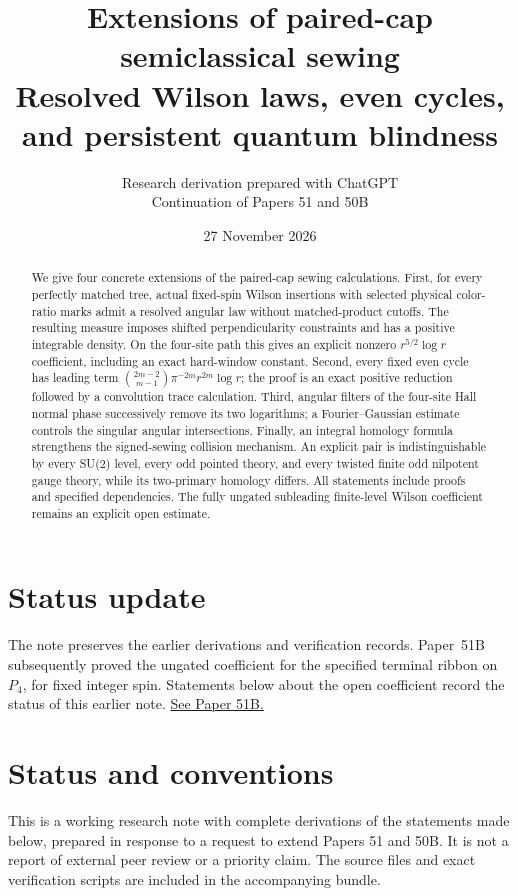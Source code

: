 \documentclass[11pt]{article}
\title{Extensions of paired-cap semiclassical sewing\\[4pt]
\large Resolved Wilson laws, even cycles, and persistent quantum blindness}
\author{Research derivation prepared with ChatGPT\\
\small Continuation of Papers 51 and 50B}
\date{27 November 2026}
\theoremstyle{remark}\newtheorem{remark}[theorem]{Remark}
\begin{document}
\maketitle
\begin{abstract}
We give four concrete extensions of the paired-cap sewing calculations.
First, for every perfectly matched tree, actual fixed-spin Wilson
insertions with selected physical color-ratio marks admit a resolved
angular law without matched-product cutoffs. The resulting measure
imposes shifted perpendicularity constraints and has a positive
integrable density. On the four-site path this gives an explicit nonzero
$r^{5/2}\log r$ coefficient, including an exact hard-window constant.
Second, every fixed even cycle has leading term
$\binom{2m-2}{m-1}\pi^{-2m}r^{2m}\log r$; the proof is an exact
positive reduction followed by a convolution trace calculation.
Third, angular filters of the four-site Hall normal phase successively
remove its two logarithms; a Fourier--Gaussian estimate controls the
singular angular intersections. Finally, an integral homology formula
strengthens the signed-sewing collision mechanism. An explicit pair
is indistinguishable by every SU(2) level, every odd pointed theory,
and every twisted finite odd nilpotent gauge theory, while its
two-primary homology differs. All statements include proofs and
specified dependencies. The fully ungated subleading finite-level
Wilson coefficient remains an explicit open estimate.
\end{abstract}

\section*{Status update}
The note preserves the earlier derivations and verification records.
Paper~51B subsequently proved the ungated coefficient for the specified
terminal ribbon on $P_4$, for fixed integer spin. Statements below about
the open coefficient record the status of this earlier note.
\href{https://github.com/g3173028019-beep/ai-automated-quantum-gravity-research/tree/main/papers/51b-wrt-ungated-wilson}{See Paper 51B.}

\section*{Status and conventions}
This is a working research note with complete derivations of the
statements made below, prepared in response to a request to extend
Papers 51 and 50B. It is not a report of external peer review or a
priority claim. The source files and exact verification scripts are
included in the accompanying bundle.
\end{document}
